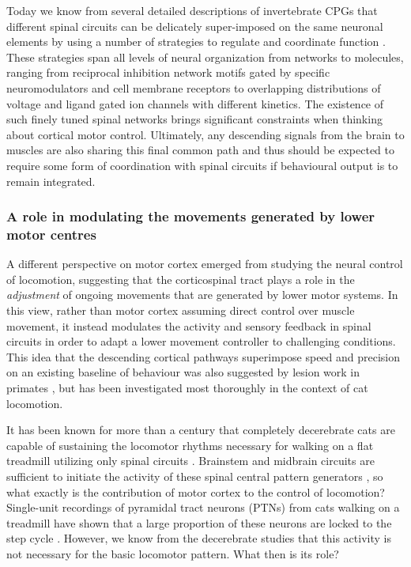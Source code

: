 Today we know from several detailed descriptions of invertebrate CPGs that different spinal circuits can be delicately super-imposed on the same neuronal elements by using a number of strategies to regulate and coordinate function \cite{Orlovsky1999,Selverston2010}. These strategies span all levels of neural organization from networks to molecules, ranging from reciprocal inhibition network motifs gated by specific neuromodulators and cell membrane receptors to overlapping distributions of voltage and ligand gated ion channels with different kinetics. The existence of such finely tuned spinal networks brings significant constraints when thinking about cortical motor control. Ultimately, any descending signals from the brain to muscles are also sharing this final common path and thus should be expected to require some form of coordination with spinal circuits if behavioural output is to remain integrated.

\subsubsection*{A role in modulating the movements generated by lower motor centres}

A different perspective on motor cortex emerged from studying the neural control of locomotion, suggesting that the corticospinal tract plays a role in the \emph{adjustment} of ongoing movements that are generated by lower motor systems. In this view, rather than motor cortex assuming direct control over muscle movement, it instead modulates the activity and sensory feedback in spinal circuits in order to adapt a lower movement controller to challenging conditions. This idea that the descending cortical pathways superimpose speed and precision on an existing baseline of behaviour was also suggested by lesion work in primates \cite{Lawrence1968a}, but has been investigated most thoroughly in the context of cat locomotion.

It has been known for more than a century that completely decerebrate cats are capable of sustaining the locomotor rhythms necessary for walking on a flat treadmill utilizing only spinal circuits \cite{GrahamBrown1911}. Brainstem and midbrain circuits are sufficient to initiate the activity of these spinal central pattern generators \cite{Grillner1973}, so what exactly is the contribution of motor cortex to the control of locomotion? Single-unit recordings of pyramidal tract neurons (PTNs) from cats walking on a treadmill have shown that a large proportion of these neurons are locked to the step cycle \cite{Armstrong1984a}. However, we know from the decerebrate studies that this activity is not necessary for the basic locomotor pattern. What then is its role?

